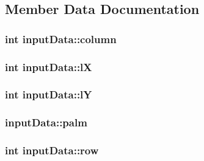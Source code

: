 \subsection{Member Data Documentation}
\hypertarget{classinputData_a54f2c2bcec32f5cc12264d878749e346}{
\subsubsection[{column}]{\setlength{\rightskip}{0pt plus 5cm}int {\bf inputData::column}}}
\label{classinputData_a54f2c2bcec32f5cc12264d878749e346}
\hypertarget{classinputData_ae1262f428775758c7a5134424ccbc9c7}{
\subsubsection[{lX}]{\setlength{\rightskip}{0pt plus 5cm}int {\bf inputData::lX}}}
\label{classinputData_ae1262f428775758c7a5134424ccbc9c7}
\hypertarget{classinputData_ada93733b51163d0692ade2b89eb398ef}{
\subsubsection[{lY}]{\setlength{\rightskip}{0pt plus 5cm}int {\bf inputData::lY}}}
\label{classinputData_ada93733b51163d0692ade2b89eb398ef}
\hypertarget{classinputData_a9d8b8077f8da1733a98fa0cbf7f782a7}{
\subsubsection[{palm}]{ {\bf inputData::palm}}}
\label{classinputData_a9d8b8077f8da1733a98fa0cbf7f782a7}
\hypertarget{classinputData_a037542f6902942f602c2c39a96933646}{
\subsubsection[{row}]{\setlength{\rightskip}{0pt plus 5cm}int {\bf inputData::row}}}
